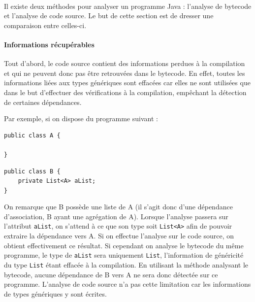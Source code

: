 \documentclass{scrartcl}
\begin{document}
    \paragraph{} Il existe deux méthodes pour analyser un programme Java : l'analyse de bytecode et l'analyse de code source. Le but de cette section est de dresser une comparaison entre celles-ci.
    
    \paragraph{Informations récupérables} Tout d'abord, le code source contient des informations perdues à la compilation et qui ne peuvent donc pas être retrouvées dans le bytecode. En effet, toutes les informations liées aux types génériques sont effacées car elles ne sont utilisées que dans le but d'effectuer des vérifications à la compilation, empêchant la détection de certaines dépendances.
    
    Par exemple, si on dispose du programme suivant :
    
    \begin{minipage}{(\textwidth/2) - 0.6cm}
        \begin{lstlisting}
public class A {

}
        \end{lstlisting}
    \end{minipage}
    \hspace{0.5cm}
    \begin{minipage}{(\textwidth/2) - 0.6cm}
        \begin{lstlisting}
public class B {
    private List<A> aList;
}
        \end{lstlisting}
    \end{minipage}
    
    On remarque que B possède une liste de A (il s'agit donc d'une dépendance d'association, B ayant une agrégation de A). Lorsque l'analyse passera sur l'attribut \texttt{aList}, on s'attend à ce que son type soit \texttt{List<A>} afin de pouvoir extraire la dépendance vers A. Si on effectue l'analyse sur le code source, on obtient effectivement ce résultat. Si cependant on analyse le bytecode du même programme, le type de \texttt{aList} sera uniquement \texttt{List}, l'information de généricité du type \texttt{List} étant effacée à la compilation. En utilisant la méthode analysant le bytecode, aucune dépendance de B vers A ne sera donc détectée sur ce programme. L'analyse de code source n'a pas cette limitation car les informations de types génériques y sont écrites.
    
\end{document}
